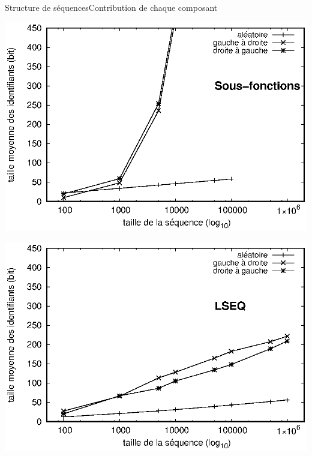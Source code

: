 \begin{frame}{Structure de séquences}{Contribution de chaque composant}
  \hspace{-1cm}
  \begin{minipage}{0.45\textwidth}
      {\includegraphics[width=1.25\textwidth]{img/replication/robin.eps}}%
  \end{minipage}
  \hspace{1.5cm}
  \begin{minipage}{0.45\textwidth}
      {\includegraphics[width=1.25\textwidth]{img/replication/lseq.eps}}%
  \end{minipage}

\end{frame}


